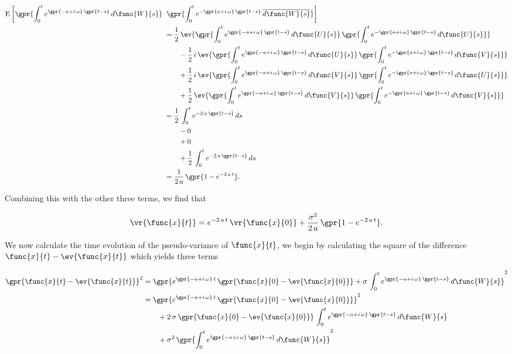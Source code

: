\begin{align}
	\text{E}\left[\gpr{\int_{0}^{t} e^{\gpr{-a + i\,\omega}\,\gpr{t - s}}\,d\func{W}{s}}\right.\,&\left.\gpr{\int_{0}^{t} e^{-\gpr{a + i\,\omega}\,\gpr{t - s}}\,\overline{d\func{W}{s}}}\right] \nonumber \\
			&= \frac{1}{2}\,\ev{\gpr{\int_{0}^{t} e^{\gpr{-a + i\,\omega}\,\gpr{t - s}}\,d\func{U}{s}}\,\gpr{\int_{0}^{t} e^{-\gpr{a + i\,\omega}\,\gpr{t - s}}\,d\func{U}{s}}} \nonumber \\
				&\qquad - \frac{1}{2}\,i\,\ev{\gpr{\int_{0}^{t} e^{\gpr{-a + i\,\omega}\,\gpr{t - s}}\,d\func{U}{s}}\,\gpr{\int_{0}^{t} e^{-\gpr{a + i\,\omega}\,\gpr{t - s}}\,d\func{V}{s}}} \nonumber \\
				&\qquad + \frac{1}{2}\,i\,\ev{\gpr{\int_{0}^{t} e^{\gpr{-a + i\,\omega}\,\gpr{t - s}}\,d\func{V}{s}}\,\gpr{\int_{0}^{t} e^{-\gpr{a + i\,\omega}\,\gpr{t - s}}\,d\func{U}{s}}} \nonumber \\
				&\qquad + \frac{1}{2}\,\ev{\gpr{\int_{0}^{t} e^{\gpr{-a + i\,\omega}\,\gpr{t - s}}\,d\func{V}{s}}\,\gpr{\int_{0}^{t} e^{-\gpr{a + i\,\omega}\,\gpr{t - s}}\,d\func{V}{s}}} \nonumber \\
			&= \frac{1}{2}\,\int_{0}^{t} e^{-2\,a\,\gpr{t - s}}\,ds \nonumber \\
				&\qquad - 0 \nonumber \\
				&\qquad + 0 \nonumber \\
				&\qquad + \frac{1}{2}\,\int_{0}^{t} e^{-2\,a\,\gpr{t - s}}\,ds \nonumber \\
			&= \frac{1}{2\,a}\,\gpr{1 - e^{-2\,a\,t}}.
\end{align}

Combining this with the other three terms, we find that

\begin{equation}
	\vr{\func{x}{t}} = e^{-2\,a\,t}\,\vr{\func{x}{0}} + \frac{\sigma^2}{2\,a}\,\gpr{1 - e^{-2\,a\,t}}.
\end{equation}

We now calculate the time evolution of the pseudo-variance of $\func{x}{t}$, we begin by calculating the square of the difference $\func{x}{t} - \ev{\func{x}{t}}$ which yields three terms

\begin{align}
	\gpr{\func{x}{t} - \ev{\func{x}{t}}}^2 &= \gpr{e^{\gpr{-a + i\,\omega}\,t}\,\gpr{\func{x}{0} - \ev{\func{x}{0}}} + \sigma\,\int_{0}^{t} e^{\gpr{-a + i\,\omega}\,\gpr{t - s}}\,d\func{W}{s}}^2 \nonumber \\
		&= \gpr{e^{\gpr{-a + i\,\omega}\,t}\,\gpr{\func{x}{0} - \ev{\func{x}{0}}}}^2 \nonumber \\
			&\qquad + 2\,\sigma\,\gpr{\func{x}{0} - \ev{\func{x}{0}}}\,\int_{0}^{t} e^{\gpr{-a + i\,\omega}\,\gpr{t - s}}\,d\func{W}{s} \nonumber \\
			&\qquad + \sigma^2\,\gpr{\int_{0}^{t} e^{\gpr{-a + i\,\omega}\,\gpr{t - s}}\,d\func{W}{s}}^2
\end{align}

